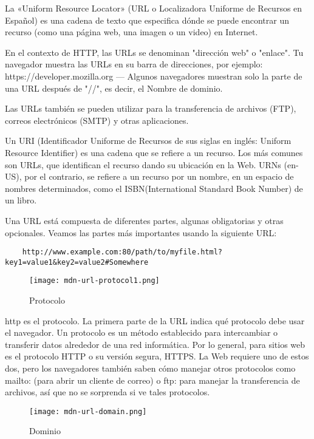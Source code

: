 La «Uniform Resource Locator» (URL o Localizadora Uniforme de Recursos en Español) es una cadena de texto que especifica dónde se puede encontrar un recurso (como una página web, una imagen o un video) en Internet.

En el contexto de HTTP, las URLs se denominan "dirección web" o "enlace". Tu navegador muestra las URLs en su barra de direcciones, por ejemplo: https://developer.mozilla.org — Algunos navegadores muestran solo la parte de una URL después de "//", es decir, el Nombre de dominio.

Las URLs también se pueden utilizar para la transferencia de archivos (FTP), correos electrónicos (SMTP) y otras aplicaciones.

Un URI (Identificador Uniforme de Recursos de sus siglas en inglés: Uniform Resource Identifier) es una cadena que se refiere a un recurso. Los más comunes son URLs, que identifican el recurso dando su ubicación en la Web. URNs (en-US), por el contrario, se refiere a un recurso por un nombre, en un espacio de nombres determinados, como el ISBN(International Standard Book Number) de un libro.

Una URL está compuesta de diferentes partes, algunas obligatorias y otras opcionales. Veamos las partes más importantes usando la siguiente URL:

\begin{lstlisting}
	http://www.example.com:80/path/to/myfile.html?key1=value1&key2=value2#Somewhere
\end{lstlisting}

\begin{figure}[H]
	\center
	\texttt{[image: mdn-url-protocol1.png]}
	\caption{Protocolo}
\end{figure}

http es el protocolo. La primera parte de la URL indica qué protocolo debe usar el navegador. Un protocolo es un método establecido para intercambiar o transferir datos alrededor de una red informática. Por lo general, para sitios web es el protocolo HTTP o su versión segura, HTTPS. La Web requiere uno de estos dos, pero los navegadores también saben cómo manejar otros protocolos como mailto: (para abrir un cliente de correo) o ftp: para manejar la transferencia de archivos, así que no se sorprenda si ve tales protocolos.

\begin{figure}[H]
	\center
	\texttt{[image: mdn-url-domain.png]}
	\caption{Dominio}
\end{figure}


